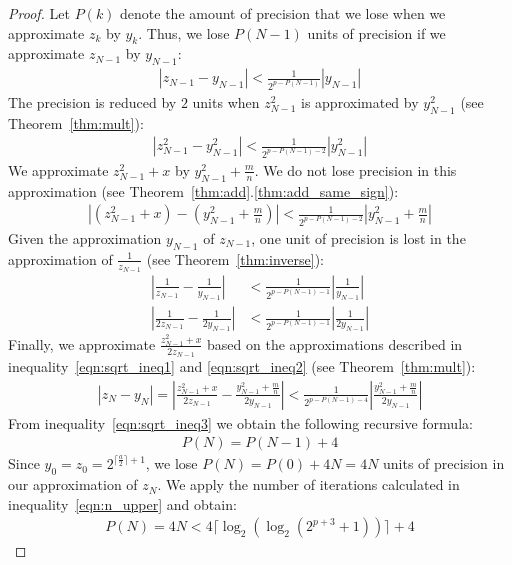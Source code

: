 \documentclass{article}
\newcommand{\sqrtexp}{\log_2(\log_2(2^{p+3}+1))}
\numberwithin{mytheorem}{section}
\begin{document}
\begin{proof}
Let $P(k)$ denote the amount of precision that we lose when we approximate $z_k$ by $y_k$. Thus, we lose $P(N-1)$ units of precision if we approximate $z_{N-1}$ by $y_{N-1}$:
\begin{align*}
|z_{N-1}-y_{N-1}|<\frac{1}{2^{p-P(N-1)}}|y_{N-1}|
\end{align*}
The precision is reduced by $2$ units when $z_{N-1}^2$ is approximated by $y_{N-1}^2$ (see Theorem~\ref{thm:mult}):
\begin{align*}
|z_{N-1}^2-y_{N-1}^2|<\frac{1}{2^{p-P(N-1)-2}}|y_{N-1}^2|
\end{align*}
We approximate $z_{N-1}^2+x$ by $y_{N-1}^2+\frac{m}{n}$. We do not lose precision in this approximation (see Theorem~\ref{thm:add}.\ref{thm:add_same_sign}):
\begin{align}
|(z_{N-1}^2+x)-(y_{N-1}^2+\frac{m}{n})|<\frac{1}{2^{p-P(N-1)-2}}|y_{N-1}^2+\frac{m}{n}|\label{eqn:sqrt_ineq1}
\end{align}
Given the approximation $y_{N-1}$ of $z_{N-1}$, one unit of precision is lost in the approximation of $\frac{1}{z_{N-1}}$ (see Theorem~\ref{thm:inverse}):
\begin{align}
|\frac{1}{z_{N-1}}-\frac{1}{y_{N-1}}|&<\frac{1}{2^{p-P(N-1)-1}}|\frac{1}{y_{N-1}}|\nonumber \\
|\frac{1}{2z_{N-1}}-\frac{1}{2y_{N-1}}|&<\frac{1}{2^{p-P(N-1)-1}}|\frac{1}{2y_{N-1}}|\label{eqn:sqrt_ineq2}
\end{align}
Finally, we approximate $\frac{z_{N-1}^2+x}{2z_{N-1}}$ based on the approximations described in inequality~\eqref{eqn:sqrt_ineq1} and \eqref{eqn:sqrt_ineq2} (see Theorem~\ref{thm:mult}):
\begin{align}
|z_N-y_N|=|\frac{z_{N-1}^2+x}{2z_{N-1}}-\frac{y_{N-1}^2+\frac{m}{n}}{2y_{N-1}}|<\frac{1}{2^{p-P(N-1)-4}}|\frac{y_{N-1}^2+\frac{m}{n}}{2y_{N-1}}|\label{eqn:sqrt_ineq3}
\end{align}
From inequality~\eqref{eqn:sqrt_ineq3} we obtain the following recursive formula:
\begin{align*}
P(N)=P(N-1)+4
\end{align*}
Since $y_0=z_0=2^{\lceil\frac{a}{2} \rceil +1}$, we lose $P(N)=P(0)+4N=4N$ units of precision in our approximation of $z_N$. We apply the number of iterations calculated in inequality~\eqref{eqn:n_upper} and obtain:
\begin{align*}
P(N)=4N<4\lceil\sqrtexp \rceil+4
\end{align*}

\end{proof}
\end{document}
